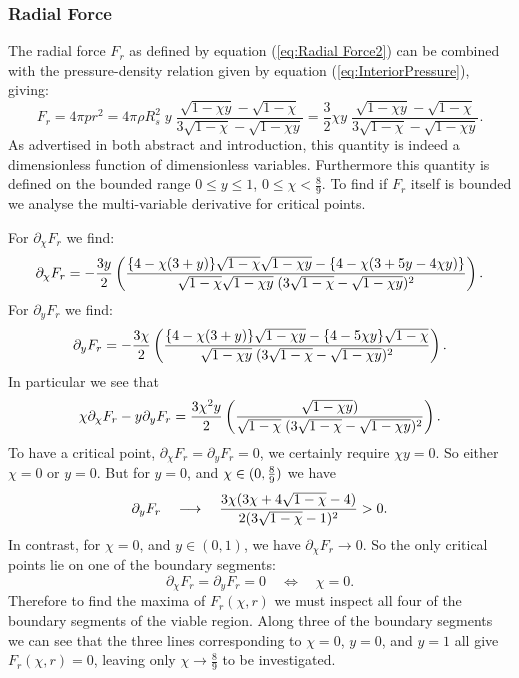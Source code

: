 \documentclass[12pt]{article}
\begin{document}
\subsubsection{Radial Force}

The radial force $F_r$ as defined by equation (\ref{eq:Radial Force2}) can be combined with the pressure-density relation given by equation (\ref{eq:InteriorPressure}), giving:
%
\begin{equation}
    \label{eq:ISC F_r}
    F_r = 4\pi p r^2 = 4\pi  \rho R_s^2\; y \; \frac{\sqrt{1-\chi y}-\sqrt{1-\chi}}{3\sqrt{1-\chi}-\sqrt{1-\chi y}} = \frac{3}{2} \chi y \; \frac{\sqrt{1-\chi y}-\sqrt{1-\chi}}{3\sqrt{1-\chi}-\sqrt{1-\chi y}}.
\end{equation}
%
As advertised in both abstract and introduction, this quantity is indeed a dimensionless function of dimensionless variables. Furthermore this quantity  is defined on the bounded range $0 \leq y \leq 1$, $0\leq \chi <\frac{8}{9}$. To find if $F_r$ itself is bounded we analyse the multi-variable derivative for critical points.
%

\enlargethispage{20pt}
For $\partial_\chi F_r$ we find:
\begin{equation}
\partial_\chi F_r = -{3 y\over2} \left(\frac
{ \{4-\chi(3+y) \} \sqrt{1-\chi}\sqrt{1-\chi y} -\{4-\chi(3+5y-4\chi y)\}  }
{\sqrt{1-\chi}\sqrt{1 - \chi y}\;(3\sqrt{1-\chi}-\sqrt{1 - \chi y})^2} \right).
\end{equation}
For $\partial_y F_r$ we find:
\begin{equation}
\partial_y F_r = -{3\chi\over2} \left(\frac
{\{4-\chi(3+y)\} \sqrt{1-\chi y}-\{4-5\chi y\} \sqrt{1-\chi} }
{\sqrt{1 - \chi y}\;(3\sqrt{1-\chi}-\sqrt{1 - \chi y})^2} \right).
\end{equation}
In particular we see that
\begin{equation}
\chi \partial_\chi F_r - y \partial_y F_r = 
{3\chi^2 y\over2} \left(\frac
{ \sqrt{1-\chi y}) }
{\sqrt{1-\chi}\;(3\sqrt{1-\chi}-\sqrt{1 - \chi y})^2} \right).
\end{equation}
To have a critical point, $ \partial_\chi F_r = \partial_y F_r = 0$, we certainly require $\chi y =0$. So either $\chi=0$ or $y=0$. 
But for $y=0$, and $\chi\in(0,{8\over9})$ we have
\begin{equation}
\partial_y F_r  
\quad\longrightarrow\quad 
 {3\chi(3\chi + 4 \sqrt{1-\chi}-4)\over 2 (3\sqrt{1-\chi}-1)^2} > 0. 
\end{equation}
In contrast, for $\chi=0$, and $y\in(0,1)$, we have $\partial_\chi F_r  \to 0$. 
So the only critical points lie on one of the boundary segments:
\begin{equation}
 \partial_\chi F_r = \partial_y F_r = 0 \quad\iff\quad \chi = 0.
\end{equation}
Therefore to find the maxima of $F_r(\chi,r)$ we must inspect all four of the boundary segments of the viable region. Along three of the boundary segments we can see that the three lines corresponding to $\chi =0$, $y = 0$, and $y = 1$ all give $F_r(\chi,r) = 0$, leaving only $\chi \rightarrow \frac{8}{9}$ to be investigated. 
\end{document}
